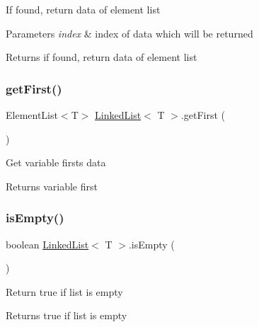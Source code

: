 If found, return data of element list 
\begin{DoxyParams}{Parameters}
{\em index} & index of data which will be returned \\
\hline
\end{DoxyParams}
\begin{DoxyReturn}{Returns}
if found, return data of element list 
\end{DoxyReturn}
\mbox{\label{class_linked_list_a312a0b29e235fdd9e0ceb42048e26600}} 
\subsubsection{\texorpdfstring{get\+First()}{getFirst()}}
{\footnotesize\ttfamily Element\+List$<$T$>$ \mbox{\hyperlink{class_linked_list}{Linked\+List}}$<$ T $>$.get\+First (\begin{DoxyParamCaption}{ }\end{DoxyParamCaption})\hspace{0.3cm}{\ttfamily [inline]}}

Get variable first\textquotesingle{}s data \begin{DoxyReturn}{Returns}
variable first 
\end{DoxyReturn}
\mbox{\label{class_linked_list_aecae3d82587c52087a4f65d6c56900e2}} 
\subsubsection{\texorpdfstring{is\+Empty()}{isEmpty()}}
{\footnotesize\ttfamily boolean \mbox{\hyperlink{class_linked_list}{Linked\+List}}$<$ T $>$.is\+Empty (\begin{DoxyParamCaption}{ }\end{DoxyParamCaption})\hspace{0.3cm}{\ttfamily [inline]}}

Return true if list is empty \begin{DoxyReturn}{Returns}
true if list is empty 
\end{DoxyReturn}
\mbox{\label{class_linked_list_a85388ca2d7e4c8bc06fbea2c6fcfea33}} 
